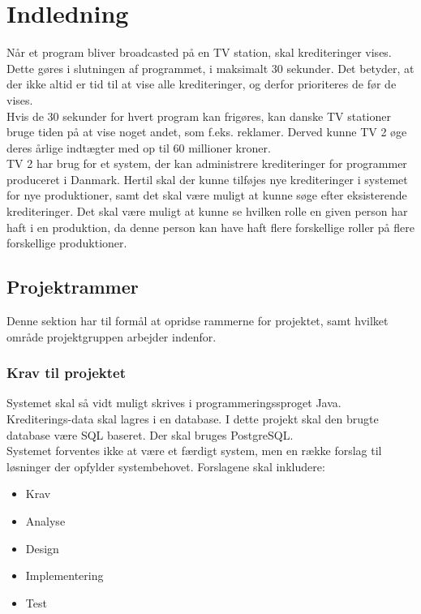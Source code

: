 \section{Indledning}
Når et program bliver broadcasted på en TV station, skal krediteringer vises. Dette gøres i slutningen af programmet, i maksimalt 30 sekunder. Det betyder, at der ikke altid er tid til at vise alle krediteringer, og derfor prioriteres de før de vises. \\
Hvis de 30 sekunder for hvert program kan frigøres, kan danske TV stationer bruge tiden på at vise noget andet, som f.eks. reklamer. Derved kunne TV 2 øge deres årlige indtægter med op til 60 millioner kroner. \\
TV 2 har brug for et system, der kan administrere krediteringer for programmer produceret i Danmark. Hertil skal der kunne tilføjes nye krediteringer i systemet for nye produktioner, samt det skal være muligt at kunne søge efter eksisterende krediteringer. Det skal være muligt at kunne se hvilken rolle en given person har haft i en produktion, da denne person kan have haft flere forskellige roller på flere forskellige produktioner.

\subsection{Projektrammer}
Denne sektion har til formål at opridse rammerne for projektet, samt hvilket område projektgruppen arbejder indenfor.

\subsubsection{Krav til projektet}
Systemet skal så vidt muligt skrives i programmeringssproget Java. \\
Krediterings-data skal lagres i en database. I dette projekt skal den brugte database være SQL baseret. Der skal bruges PostgreSQL.\\
Systemet forventes ikke at være et færdigt system, men en række forslag til løsninger der opfylder systembehovet. Forslagene skal inkludere:

\begin{itemize}
    \item Krav
    \item Analyse
    \item Design
    \item Implementering
    \item Test
\end{itemize}

